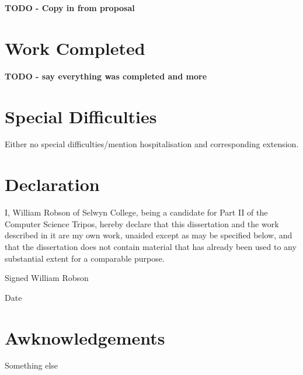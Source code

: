 \textbf{TODO - Copy in from proposal}

\section*{Work Completed}

\textbf{TODO - say everything was completed and more}

\section*{Special Difficulties}

Either no special difficulties/mention hospitalisation and corresponding extension.

\pagebreak

\section*{Declaration}

I, William Robson of Selwyn College, being a candidate for Part II of the Computer Science Tripos,
hereby declare that this dissertation and the work described in it are my own work, unaided except
as may be specified below, and that the dissertation does not contain material that has already
been used to any substantial extent for a comparable purpose.

Signed William Robson

Date \thedate

\cleardoublepage

\tableofcontents

\newpage

\section*{Awknowledgements}

Something else

\cleardoublepage
\setcounter{page}{1}
\pagestyle{headings}